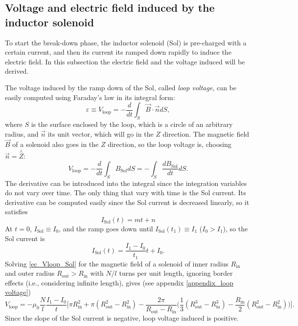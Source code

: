 \documentclass[a4paper,12pt,oneside]{book}
\begin{document}
\subsection{Voltage and electric field induced by the inductor solenoid}
\label{sec_loop_voltage_field_Sol_theory}

To start the break-down phase, the inductor solenoid (Sol) is pre-charged with a certain current, and then its current its ramped down rapidly to induce the electric field. In this subsection the electric field and the voltage induced will be derived.


The voltage induced by the ramp down of the Sol, called \textit{loop voltage}, can be easily computed using Faraday's law in its integral form:
%
\begin{equation}\label{ec_Faraday_loop}
\varepsilon \equiv V_\text{loop} = -\dfrac{d}{dt} \int_S \vec{B} \cdot \vec{n} dS,
\end{equation}
where $S$ is the surface enclosed by the loop, which is a circle of an arbitrary radius, and $\vec{n}$ its unit vector, which will go in the $Z$ direction. The magnetic field $\vec{B}$ of a solenoid also goes in the $Z$ direction, so the loop voltage is, choosing $\vec{n}=\stackrel{\wedge}{Z}$:
%
\begin{equation}\label{ec_Vloop_Sol}
V_\text{loop} = - \dfrac{d}{dt} \int_S B_\text{Sol} dS= - \int_S \dfrac{d B_\text{Sol}}{dt} dS.
\end{equation}
The derivative can be introduced into the integral since the integration variables do not vary over time. The only thing that vary with time is the Sol current. Its derivative can be computed easily since the Sol current is decreased linearly, so it satisfies
%
\begin{equation}
I_\text{Sol}(t)=m t +n
\end{equation}
At $t=0$, $I_\text{Sol} \equiv I_0$, and the ramp goes down until $I_\text{Sol}(t_1) \equiv  I_1$ ($I_0>I_1$), so the Sol current is
%
\begin{equation}
I_\text{Sol}(t)=\dfrac{I_1-I_0}{t_1} t +I_0.
\end{equation}
Solving \eqref{ec_Vloop_Sol} for the magnetic field of a solenoid of inner radius $R_\text{in}$ and outer radius $R_\text{out}>R_\text{in}$ with $N/l$ turns per unit length, ignoring border effects (i.e., considering infinite length), gives (see appendix \ref{appendix_loop voltage})
\begin{equation}
V_\text{loop}= - \mu_0 \dfrac{N}{l} \dfrac{I_1-I_0}{t} \Big[ \pi R_\text{in}^2  + \pi (R_\text{out}^2-R_\text{in}^2) - \dfrac{2 \pi}{R_\text{out}-R_\text{in}} \Big( \dfrac{1}{3} (R_\text{out}^3-R_\text{in}^3) - \dfrac{R_\text{in}}{2} (R_\text{out}^2-R_\text{in}^2) \Big) \Big].
\end{equation}
Since the slope of the Sol current is negative, loop voltage induced is positive.
\end{document}
